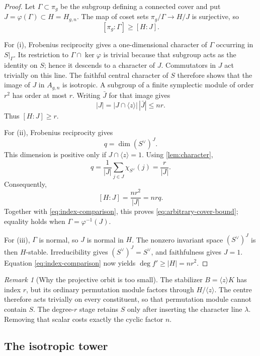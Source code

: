 \documentclass[11pt,reqno]{amsart}
\numberwithin{equation}{section}
\theoremstyle{remark}
\newtheorem{remark}[remark]{Remark}
\begin{document}
\begin{proof}
Let \(\Gamma\subset\pi_g\) be the subgroup defining a connected cover and
put \(J=\varphi(\Gamma)\subset H=H_{g,n}\).  The map of coset sets
\(\pi_g/\Gamma\to H/J\) is surjective, so
\[
 [\pi_g:\Gamma]\geq[H:J].
\tag{2.9}\label{eq:index-comparison}
\]

For (i), Frobenius reciprocity gives a one-dimensional character of
\(\Gamma\) occurring in \(S|_\Gamma\).  Its restriction to
\(\Gamma\cap\ker\varphi\) is trivial because that subgroup acts as the
identity on \(S\); hence it descends to a character of \(J\).
Commutators in \(J\) act trivially on this line.  The faithful central
character of \(S\) therefore shows that the image of \(J\) in
\(A_{g,n}\) is isotropic.  A subgroup of a finite symplectic module of
order \(r^2\) has order at most \(r\).  Writing \(\bar J\) for that
image gives
\[
 |J|=|J\cap\langle z\rangle|\,|\bar J|\leq nr.
\]
Thus \([H:J]\geq r\).

For (ii), Frobenius reciprocity gives
\[
 q=\dim(S^\vee)^J.
\tag{2.10}\label{eq:multiplicity-invariants}
\]
This dimension is positive only if \(J\cap\langle z\rangle=1\).
Using \cref{lem:character},
\[
 q=\frac1{|J|}\sum_{j\in J}\chi_{S^\vee}(j)
 =\frac r{|J|}.
\tag{2.11}\label{eq:average-character}
\]
Consequently,
\[
 [H:J]=\frac{nr^2}{|J|}=nrq.
\]
Together with \eqref{eq:index-comparison}, this proves
\eqref{eq:arbitrary-cover-bound}; equality holds when
\(\Gamma=\varphi^{-1}(J)\).

For (iii), \(\Gamma\) is normal, so \(J\) is normal in \(H\).  The
nonzero invariant space \((S^\vee)^J\) is then \(H\)-stable.
Irreducibility gives \((S^\vee)^J=S^\vee\), and faithfulness gives
\(J=1\).  Equation
\eqref{eq:index-comparison} now yields \(\deg f'\geq|H|=nr^2\).
\end{proof}

\begin{remark}[Why the projective orbit is too small]\label{rem:projective-stabilizer}
The stabilizer \(B=\langle z\rangle K\) has index \(r\), but its ordinary
permutation module factors through \(H/\langle z\rangle\).  The centre
therefore acts trivially on every constituent, so that permutation
module cannot contain \(S\).  The degree-\(r\) stage retains \(S\) only
after inserting the character line \(\lambda\).  Removing that scalar
costs exactly the cyclic factor \(n\).
\end{remark}

\subsection{The isotropic tower}
\end{document}
